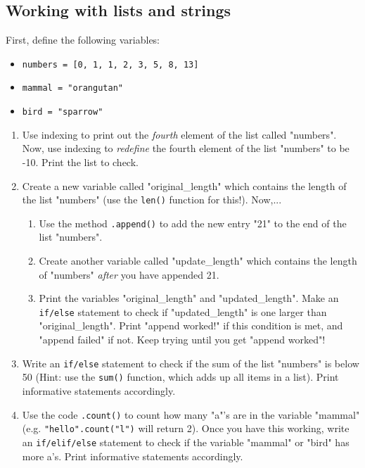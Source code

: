 \documentclass{article}[12pt]
\newcommand{\code}[1]{\texttt{#1}}  %
\begin{document}
\vspace{1.5cm}

\subsection{Working with lists and strings}

First, define the following variables: 
	\begin{itemize}
        \item \code{numbers = [0, 1, 1, 2, 3, 5, 8, 13]}
        \item \code{mammal  = "orangutan"}
        \item \code{bird    = "sparrow"}
    \end{itemize}

    \begin{enumerate}
        \item Use indexing to print out the \emph{fourth} element of the list called "numbers". Now, use indexing to \emph{redefine} the fourth element of the list "numbers" to be -10. Print the list to check.
    
        \item Create a new variable called "original\_length" which contains the length of the list "numbers" (use the \code{len()} function for this!). Now,...
        \begin{enumerate}
            \item Use the method \code{.append()} to add the new entry "21" to the end of the list "numbers". 
            \item Create another variable called "update\_length" which contains the length of "numbers" \emph{after} you have appended 21. 
            \item Print the variables "original\_length" and "updated\_length". Make an \code{if/else} statement to check if "updated\_length" is one larger than "original\_length". Print "append worked!" if this condition is met, and "append failed" if not. Keep trying until you get "append worked"!
        \end{enumerate}    
        \item Write an \code{if/else} statement to check if the sum of the list "numbers" is below 50 (Hint: use the \code{sum()} function, which adds up all items in a list). Print informative statements accordingly. 
    
        \item Use the code \code{.count()} to count how many "a"'s are in the variable "mammal" (e.g. \code{"hello".count("l")} will return 2). Once you have this working, write an \code{if/elif/else} statement to check if the variable "mammal" or "bird" has more a's. Print informative statements accordingly.
    

\end{enumerate}
\end{document}
